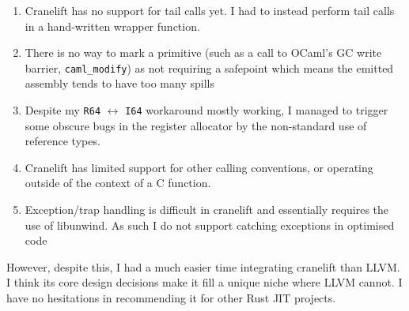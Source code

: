 \begin{enumerate}
      \item Cranelift has no support for tail calls yet. I had to instead perform tail calls in a
            hand-written wrapper function.
      \item There is no way to mark a primitive (such as a call to OCaml's GC write barrier,
            \texttt{caml\_modify}) as not requiring a safepoint which means the emitted assembly
            tends to have
            too many spills
      \item Despite my \texttt{R64} $\leftrightarrow$ \texttt{I64} workaround mostly working, I
            managed to trigger some obscure bugs in the register allocator by the non-standard use
            of reference
            types.
      \item Cranelift has limited support for other calling conventions, or operating outside of
            the context of a C function.
      \item Exception/trap handling is difficult in cranelift and essentially requires the use of
            libunwind. As such I do not support catching exceptions in optimised code
\end{enumerate}

However, despite this, I had a much easier time integrating cranelift than LLVM. I think its core
design decisions make it fill a unique niche where LLVM cannot. I have no hesitations in
recommending it for other Rust JIT projects.
